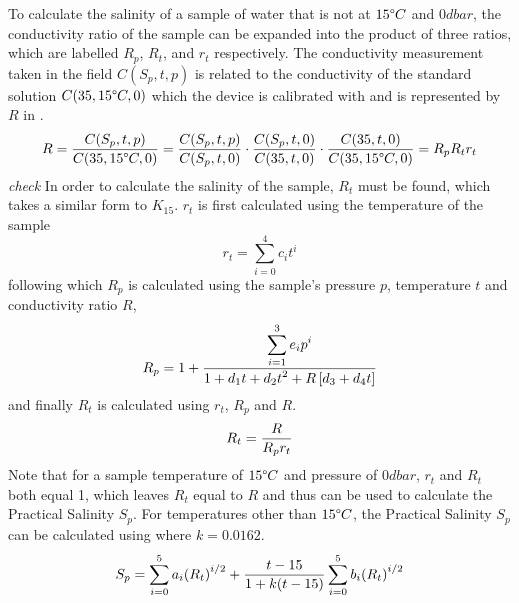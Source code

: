 To calculate the salinity of a sample of water that is not at $15\degree C$ and $0 dbar$, the conductivity ratio of the sample can be expanded into the product of three ratios, which are labelled $R_p$, $R_t$, and $r_t$ respectively.
The conductivity measurement taken in the field $C(S_p, t, p)$ is related to the conductivity of the standard solution $C(35, 15\degree C, 0)$ which the device is calibrated with and is represented by $R$ in .~\cite{ioc_teos_2010}
\begin{equation}\label{eqn:pss-78-full-ratio}
 R = \frac{\displaystyle C(S_p, t, p)}{\displaystyle C(35, 15\degree C, 0)} = \frac{\displaystyle C(S_p, t, p)}{\displaystyle C(S_p, t, 0)} \cdot \frac{\displaystyle C(S_p, t, 0)}{\displaystyle C(35, t, 0)} \cdot \frac{\displaystyle C(35, t, 0)}{\displaystyle C(35, 15\degree C, 0)} = R_p R_t r_t
\end{equation}
\textit{check}
In order to calculate the salinity of the sample, $R_t$ must be found, which takes a similar form to $K_{15}$.
$r_t$ is first calculated using the temperature of the sample 
\begin{equation}\label{eqn:pss-78-rt}
 r_t = \sum_{i=0}^{4} c_i {t}^i
\end{equation}
following which $R_p$ is calculated using the sample's pressure $p$, temperature $t$ and conductivity ratio $R$,
\begin{equation}\label{eqn:pss-78-rp}
 R_p = 1 + \frac{\displaystyle\sum_{i=1}^{3} e_i p^i}{\displaystyle1 + d_1 t + d_2 {t}^2 + R\left[ d_3 + d_4 t \right]}
\end{equation}
and finally $R_t$ is calculated using $r_t$, $R_p$ and $R$.
\begin{equation}\label{eqn:pss-78-Rt}
 R_t = \frac{\displaystyle R}{\displaystyle R_p r_t}
\end{equation}
Note that for a sample temperature of $15\degree C$ and pressure of $0 dbar$, $r_t$ and $R_t$ both equal 1, which leaves $R_t$ equal to $R$ and thus  can be used to calculate the Practical Salinity $S_p$.
For temperatures other than $15\degree C$, the Practical Salinity $S_p$ can be calculated using  where $k = 0.0162$.~\cite{ioc_teos_2010}
\begin{equation}\label{eqn:pss-78-full}
 S_p = \sum_{i=0}^{5} a_i {(R_t)}^{i/2} + \frac{\displaystyle t-15}{\displaystyle1+k(t-15)} \sum_{i=0}^{5} b_i {(R_t)}^{i/2}
\end{equation}

